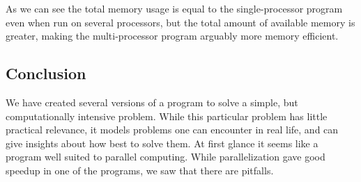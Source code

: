 \documentclass[a4paper, 12pt]{article}
\begin{document}
    As we can see the total memory usage is equal to the single-processor program even when run on several processors, but the total amount of available memory is greater, making the multi-processor program arguably more memory efficient.

    \subsection{Conclusion}
    We have created several versions of a program to solve a simple, but computationally intensive problem. While this particular problem has little practical relevance, it models problems one can encounter in real life, and can give insights about how best to solve them. At first glance it seems like a program well suited to parallel computing. While parallelization gave good speedup in one of the programs, we saw that there are pitfalls.
\end{document}
